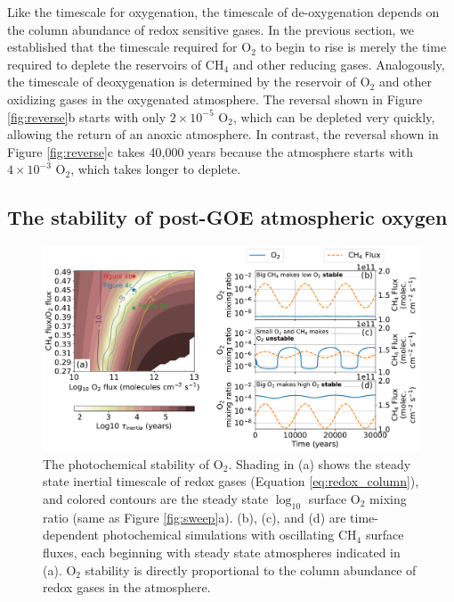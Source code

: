 Like the timescale for oxygenation, the timescale of de-oxygenation depends on the column abundance of redox sensitive gases. In the previous section, we established that the timescale required for O$_2$ to begin to rise is merely the time required to deplete the reservoirs of CH$_4$ and other reducing gases. Analogously, the timescale of deoxygenation is determined by the reservoir of O$_2$ and other oxidizing gases in the oxygenated atmosphere. The reversal shown in Figure \ref{fig:reverse}b starts with only $2 \times 10^{-5}$ O$_2$, which can be depleted very quickly, allowing the return of an anoxic atmosphere. In contrast, the reversal shown in Figure \ref{fig:reverse}c takes 40,000 years because the atmosphere starts with $4 \times 10^{-3}$ O$_2$, which takes longer to deplete. 

\subsection{The stability of post-GOE atmospheric oxygen} \label{sec:stability}

\begin{figure}
  \centering
  \includegraphics[width=\textwidth]{tex/4goe/main/Stability.pdf}
  \caption{The photochemical stability of O$_2$. Shading in (a) shows the steady state inertial timescale of redox gases (Equation \eqref{eq:redox_column}), and colored contours are the steady state $\log_{10}$ surface O$_2$ mixing ratio (same as Figure \ref{fig:sweep}a). (b), (c), and (d) are time-dependent photochemical simulations with oscillating CH$_4$ surface fluxes, each beginning with steady state atmospheres indicated in (a). O$_2$ stability is directly proportional to the column abundance of redox gases in the atmosphere.}
  \label{fig:stability}
\end{figure}

